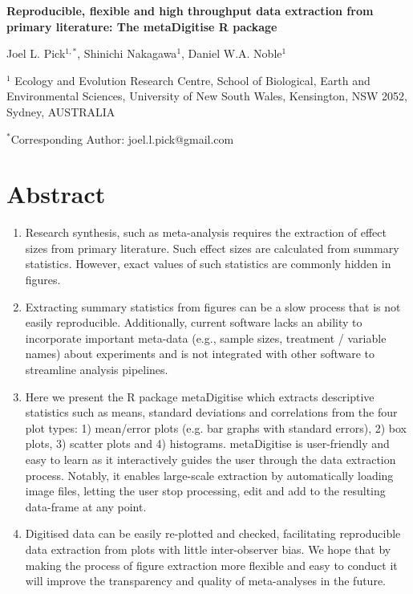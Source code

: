 \documentclass[12pt]{article}
\newcommand{\pkg}[1]{{\fontseries{b}\selectfont #1}}
\let\proglang=\textsf
\begin{document}
\newenvironment{CodeChunk}{}{}

\raggedright


\textbf{Reproducible, flexible and high throughput data extraction from primary literature: The \pkg{metaDigitise} \proglang{R} package}

Joel L. Pick$^{1,*}$, Shinichi Nakagawa$^1$, Daniel W.A. Noble$^1$

$^1$
  Ecology and Evolution Research Centre, School of Biological, Earth and Environmental Sciences,  University of New South Wales, Kensington, NSW 2052, Sydney, AUSTRALIA

 $^*$Corresponding Author: joel.l.pick@gmail.com\\


\clearpage
\section*{Abstract}
\begin{enumerate} 
\item Research synthesis, such as meta-analysis requires the extraction of effect sizes from primary literature. Such effect sizes are calculated from summary statistics. However, exact values of such statistics are commonly hidden in figures. 

\item Extracting summary statistics from figures can be a slow process that is not easily reproducible. Additionally, current software lacks an ability to incorporate important meta-data (e.g., sample sizes, treatment / variable names) about experiments and is not integrated with other software to streamline analysis pipelines.

\item Here we present the R package \pkg{metaDigitise} which extracts descriptive statistics such as means, standard deviations and correlations from the four plot types: 1) mean/error plots (e.g. bar graphs with standard errors), 2) box plots, 3) scatter plots and 4) histograms. \pkg{metaDigitise} is user-friendly and easy to learn as it interactively guides the user through the data extraction process. Notably, it enables large-scale extraction by automatically loading image files, letting the user stop processing, edit and add to the resulting data-frame at any point. 

\item Digitised data can be easily re-plotted and checked, facilitating reproducible data extraction from plots with little inter-observer bias. We hope that by making the process of figure extraction more flexible and easy to conduct it will improve the transparency and quality of meta-analyses in the future.
\end{enumerate}
\end{document}

